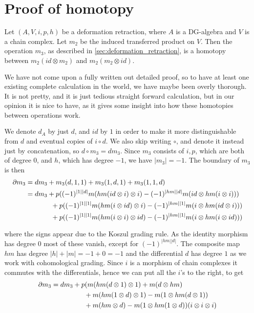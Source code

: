 
\section*{Proof of homotopy}

\begin{theorem}
Let $(A,V, i,p,h)$ be a deformation retraction, where $A$ is a DG-algebra and $V$ is a chain complex. Let $m_2$ be the induced transferred product on $V$. Then the operation $m_3$, as described in \ref{sec:deformation_retraction}, is a homotopy between $m_2(id\otimes m_2)$ and $m_2(m_2\otimes id)$. 
\end{theorem}

We have not come upon a fully written out detailed proof, so to have at least one existing complete calculation in the world, we have maybe been overly thorough. It is not pretty, and it is just tedious straight forward calculation, but in our opinion it is nice to have, as it gives some insight into how these homotopies between operations work. 

We denote $d_A$ by just $d$, and $id$ by $1$ in order to make it more distinguishable from $d$ and eventual copies of $i\circ d$. We also skip writing $\circ$, and denote it instead just by concatenation, so $d\circ m_3 = dm_3$. Since $m_3$ consists of $i, p$, which are both of degree $0$, and $h$, which has degree $-1$, we have $|m_3|=-1$. The boundary of $m_3$ is then
\begin{align*}
    \partial m_3 
    &= dm_3+m_3(d,1,1)+m_3(1,d,1)+m_3(1,1,d)\\
    &= dm_3
    +p((-1)^{|1||d|}m(hm(id\otimes i)\otimes i)
    -(-1)^{|hm||d|}m(id\otimes hm(i\otimes i))) \\
    & \hspace{13mm} 
    +p((-1)^{|1||1|}m(hm(i\otimes id)\otimes i)
    -(-1)^{|hm||1|}m(i\otimes hm(id\otimes i))) \\
    & \hspace{13mm} 
    +p((-1)^{|1||1|}m(hm(i\otimes i)\otimes id)
    -(-1)^{|hm||1|}m(i\otimes hm(i\otimes id)))
\end{align*}

where the signs appear due to the Koszul grading rule. As the identity morphism has degree $0$ most of these vanish, except for $(-1)^{|hm||d|}$. The composite map $hm$ has degree $|h|+|m| = -1+0 = -1$ and the differential $d$ has degree $1$ as we work with cohomological grading. Since $i$ is a morphism of chain complexes it commutes with the differentials, hence we can put all the $i$'s to the right, to get 
\begin{align*}
    \partial m_3 
    &= dm_3
    +p(m(hm(d\otimes 1)\otimes 1)
    +m(d\otimes hm) \\
    & \hspace{17mm} 
    +m(hm(1\otimes d)\otimes 1)
    -m(1\otimes hm(d\otimes 1)) \\
    & \hspace{17mm} 
    +m(hm\otimes d)
    -m(1\otimes hm(1\otimes d))(i\otimes i\otimes i)
\end{align*}

